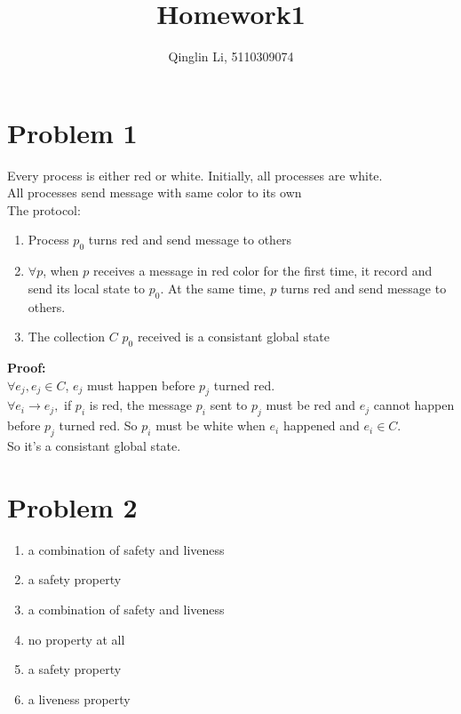 \documentclass[12pt]{article}
\date{}
\title{Homework1}
\author{Qinglin Li, 5110309074}
\begin{document}
\maketitle
\section*{Problem 1}
Every process is either red or white. Initially, all processes are white.\\
All processes send message with same color to its own\\
The protocol:
\begin{enumerate}[1.]
\item
Process $p_0$ turns red and send message to others
\item
$\forall p$, when $p$ receives a message in red color for the first time, it record and send its local state to $p_0$. At the same time, $p$ turns red and send message to others.
\item 
The collection $C$ $p_0$ received is a consistant global state
\end{enumerate}
\textbf{Proof:}\\
$\forall e_j, e_j \in C$, $e_j$ must happen before $p_j$ turned red.\\
$\forall e_i\rightarrow e_j,$ if $p_i$ is red, the message $p_i$ sent to $p_j$ must be red and $e_j$ cannot happen before $p_j$ turned red. So $p_i$ must be white when $e_i$ happened and $e_i\in C$.\\
So it's a consistant global state.
\section*{Problem 2}
\begin{enumerate}
\item a combination of safety and liveness
\item a safety property
\item a combination of safety and liveness
\item no property at all
\item a safety property
\item a liveness property
\end{enumerate}
\end{document}
